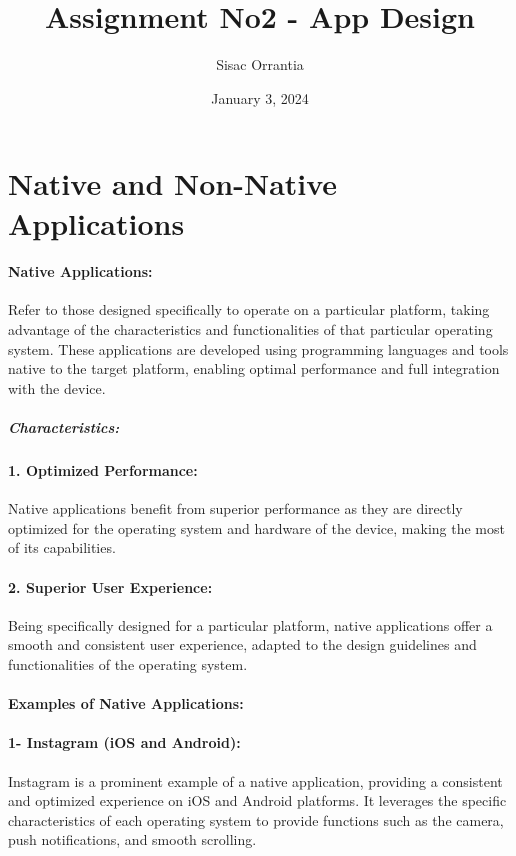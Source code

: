 \documentclass{article}
\title {Assignment No2 - App Design}
\author {Sisac Orrantia}
\date {January 3, 2024}
\begin{document}
\maketitle{}
\section{Native and Non-Native Applications}

\paragraph{Native Applications:}
Refer to those designed specifically to operate on a particular platform, taking advantage of the characteristics and functionalities of that particular operating system. These applications are developed using programming languages and tools native to the target platform, enabling optimal performance and full integration with the device.

\subparagraph{Characteristics:}
\paragraph{1. Optimized Performance:}
Native applications benefit from superior performance as they are directly optimized for the operating system and hardware of the device, making the most of its capabilities.

\paragraph{2. Superior User Experience:}
Being specifically designed for a particular platform, native applications offer a smooth and consistent user experience, adapted to the design guidelines and functionalities of the operating system.

\paragraph{Examples of Native Applications:}
\paragraph{1- Instagram (iOS and Android):}
Instagram is a prominent example of a native application, providing a consistent and optimized experience on iOS and Android platforms. It leverages the specific characteristics of each operating system to provide functions such as the camera, push notifications, and smooth scrolling.
\end{document}

